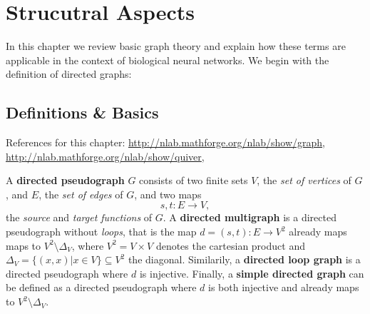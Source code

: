 \chapter{Strucutral Aspects}\label{ch:Graph Theory} %
In this chapter we review basic graph theory and explain how these
terms are applicable in the context of biological neural networks. We
begin with the definition of directed graphs:

\section{Definitions \& Basics}

References for this chapter:
\url{http://nlab.mathforge.org/nlab/show/graph},
\url{http://nlab.mathforge.org/nlab/show/quiver}, \parencite{Bang-Jensen_Digraphs} 

\begin{defn}
  A \textbf{directed pseudograph} $G$ consists of two finite  sets $V$, the \textit{set of vertices} of $G$, and
  $E$, the \textit{set of edges} of $G$, and two maps
  \[
  s,t: E \to V,
  \]
  the \textit{source} and \textit{target functions} of $G$. A
  \textbf{directed multigraph} is a directed pseudograph without
  \textit{loops}, that is the map $d = (s,t):E \to V^2$ already maps
  maps to $V^2\setminus\Delta_V$, where $V^2 = V \times V$ denotes the
  cartesian product and $\Delta_V = \{(x,x)|x \in V\} \subseteq V^2$
  the diagonal. Similarily, a \textbf{directed loop graph} is a
  directed pseudograph where $d$ is injective. Finally, a
  \textbf{simple directed graph} can be defined as a directed
  pseudograph where $d$ is both injective and already maps to
  $V^2\setminus\Delta_V$.
\end{defn}

